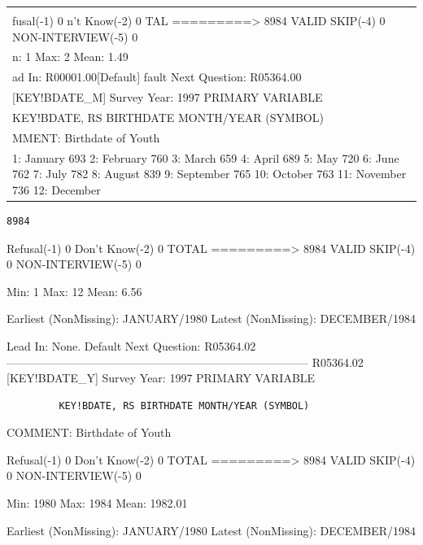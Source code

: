 \documentclass[
  man,floatsintext]{apa6}
\begin{document}
\begin{longtable}[]{@{}
  >{\centering\arraybackslash}p{}@{}}
\toprule\noalign{}
\begin{minipage}[b]{\linewidth}\centering
8984
\end{minipage} \\
\midrule\noalign{}
\endhead
\bottomrule\noalign{}
\endlastfoot
8984 \\
fusal(-1) 0
n't Know(-2) 0
TAL =========\textgreater{} 8984 VALID SKIP(-4) 0 NON-INTERVIEW(-5) 0 \\
n: 1 Max: 2 Mean: 1.49 \\
ad In: R00001.00{[}Default{]}
fault Next Question: R05364.00 \\
5364.01 {[}KEY!BDATE\_M{]} Survey Year: 1997
PRIMARY VARIABLE \\
KEY!BDATE, RS BIRTHDATE MONTH/YEAR (SYMBOL) \\
MMENT: Birthdate of Youth \\
816 1: January
693 2: February
760 3: March
659 4: April
689 5: May
720 6: June
762 7: July
782 8: August
839 9: September
765 10: October
763 11: November
736 12: December \\
\end{longtable}

\begin{verbatim}
8984
\end{verbatim}

Refusal(-1) 0
Don't Know(-2) 0
TOTAL =========\textgreater{} 8984 VALID SKIP(-4) 0 NON-INTERVIEW(-5) 0

Min: 1 Max: 12 Mean: 6.56

Earliest (NonMissing): JANUARY/1980
Latest (NonMissing): DECEMBER/1984

Lead In: None.
Default Next Question: R05364.02
--------------------------------------------------------------------------------
R05364.02 {[}KEY!BDATE\_Y{]} Survey Year: 1997
PRIMARY VARIABLE

\begin{verbatim}
         KEY!BDATE, RS BIRTHDATE MONTH/YEAR (SYMBOL)
\end{verbatim}

COMMENT: Birthdate of Youth

Refusal(-1) 0
Don't Know(-2) 0
TOTAL =========\textgreater{} 8984 VALID SKIP(-4) 0 NON-INTERVIEW(-5) 0

Min: 1980 Max: 1984 Mean: 1982.01

Earliest (NonMissing): JANUARY/1980
Latest (NonMissing): DECEMBER/1984
\end{document}

